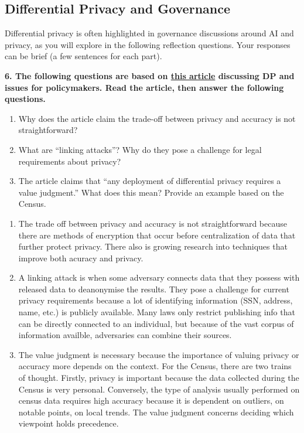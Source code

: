 \documentclass{article}
\begin{document}
\subsection*{Differential Privacy and Governance}

Differential privacy is often highlighted in governance discussions around AI and privacy, as you will explore in the following reflection questions. Your responses can be brief (a few sentences for each part).

\textbf{6. The following questions are based on \href{https://simons.berkeley.edu/news/differential-privacy-issues-policymakers}{this article} discussing DP and issues for policymakers. Read the article, then answer the following questions.}
\begin{enumerate}[label=\Alph*.]
    \item Why does the article claim the trade-off between privacy and accuracy is not straightforward?
    \item What are ``linking attacks''? Why do they pose a challenge for legal requirements about privacy?
    \item The article claims that ``any deployment of differential privacy requires a value judgment.'' What does this mean? Provide an example based on the Census.
\end{enumerate}

\bigskip
\begin{mdframed}
\begin{enumerate}[label=\Alph*.]
    \item The trade off between privacy and accuracy is not straightforward because there are methods of encryption that occur before centralization of data that further protect privacy. There also is growing research into techniques that improve both acuracy and privacy.
    \item A linking attack is when some adversary connects data that they possess with released data to deanonymise the results. They pose a challenge for current privacy requirements because a lot of identifying information (SSN, address, name, etc.) is publicly available. Many laws only restrict publishing info that can be directly connected to an individual, but because of the vast corpus of information availble, adversaries can combine their sources.
    \item The value judgment is necessary because the importance of valuing privacy or accuracy more depends on the context. For the Census, there are two trains of thought. Firstly, privacy is important because the data collected during the Census is very personal. Conversely, the type of analysis usually performed on census data requires high accuracy because it is dependent on outliers, on notable points, on local trends. The value judgment concerns deciding which viewpoint holds precedence.
\end{enumerate}
\end{mdframed}
\bigskip
\end{document}
